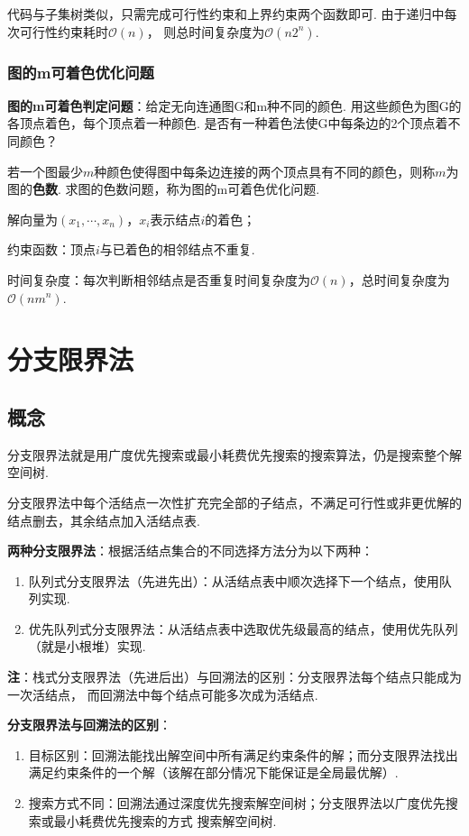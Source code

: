 \documentclass[12pt, a4paper, oneside]{ctexart}
\numberwithin{equation}{section}  %
\theoremstyle{definition}
\def\O{\mathcal{O}}         %
\begin{document}
代码与子集树类似，只需完成可行性约束和上界约束两个函数即可. 由于递归中每次可行性约束耗时$\O(n)$，
则总时间复杂度为$\O(n2^n)$.

\subsubsection{图的m可着色优化问题}
\textbf{图的m可着色判定问题}：给定无向连通图G和m种不同的颜色. 用这些颜色为图G的各顶点着色，每个顶点着一种颜色. 
是否有一种着色法使G中每条边的2个顶点着不同颜色？

若一个图最少$m$种颜色使得图中每条边连接的两个顶点具有不同的颜色，则称$m$为图的\textbf{色数}. 
求图的色数问题，称为图的m可着色优化问题.

解向量为$(x_1,\cdots, x_n)$，$x_i$表示结点$i$的着色；

约束函数：顶点$i$与已着色的相邻结点不重复.

时间复杂度：每次判断相邻结点是否重复时间复杂度为$\O(n)$，总时间复杂度为$\O(nm^n)$.

\section{分支限界法}
\subsection{概念}
分支限界法就是用广度优先搜索或最小耗费优先搜索的搜索算法，仍是搜索整个解空间树. 

分支限界法中每个活结点一次性扩充完全部的子结点，不满足可行性或非更优解的结点删去，其余结点加入活结点表. 

\textbf{两种分支限界法}：根据活结点集合的不同选择方法分为以下两种：
\begin{enumerate}
    \item 队列式分支限界法（先进先出）：从活结点表中顺次选择下一个结点，使用队列实现.
    \item 优先队列式分支限界法：从活结点表中选取优先级最高的结点，使用优先队列（就是小根堆）实现.
\end{enumerate}
\textbf{注}：栈式分支限界法（先进后出）与回溯法的区别：分支限界法每个结点只能成为一次活结点，
而回溯法中每个结点可能多次成为活结点.

\textbf{分支限界法与回溯法的区别}：
\begin{enumerate}
    \item 目标区别：回溯法能找出解空间中所有满足约束条件的解；而分支限界法找出满足约束条件的一个解（该解在部分情况下能保证是全局最优解）.
    \item 搜索方式不同：回溯法通过深度优先搜索解空间树；分支限界法以广度优先搜索或最小耗费优先搜索的方式
    搜索解空间树.
\end{enumerate}
\end{document}
